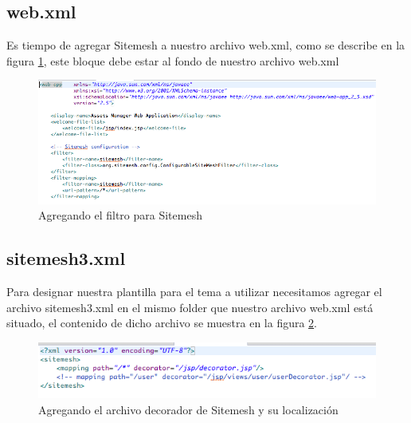\documentclass[12pt]{article}
\begin{document}
        \subsection{web.xml}
        Es tiempo de agregar Sitemesh a nuestro archivo web.xml, como se describe en la figura \ref{07_web_xml}, este bloque debe estar al fondo de nuestro archivo web.xml
        \begin{figure}[h]
            \centering
            \includegraphics[scale=0.4]{07_web_xml}
            \caption{Agregando el filtro para Sitemesh}
            \label{07_web_xml}
        \end{figure}
        \newpage
        
        \subsection{sitemesh3.xml}
        Para designar nuestra plantilla para el tema a utilizar necesitamos agregar el archivo sitemesh3.xml en el mismo folder que nuestro archivo web.xml est\'a situado, el contenido de dicho archivo se muestra en la figura \ref{08_sitemesh3_xml}.
        \begin{figure}[h]
            \centering
            \includegraphics[scale=0.4]{08_sitemesh3_xml}
            \caption{Agregando el archivo decorador de Sitemesh y su localizaci\'on}
            \label{08_sitemesh3_xml}
        \end{figure}
        \newpage
        
\end{document}
